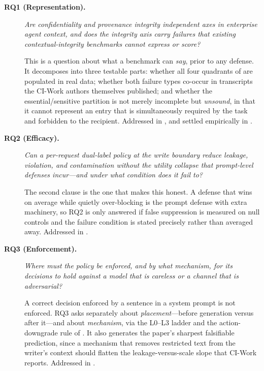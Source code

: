 \documentclass[conference,compsoc]{IEEEtran}
\begin{document}
\begin{description}
  \item[\textbf{RQ1 (Representation).}] \emph{Are confidentiality and
  provenance integrity independent axes in enterprise agent context, and does
  the integrity axis carry failures that existing contextual-integrity
  benchmarks cannot express or score?}

  This is a question about what a benchmark can \emph{say}, prior to any
  defense. It decomposes into three testable parts: whether all four quadrants
  of  are populated in real data; whether both failure
  types co-occur in transcripts the CI-Work authors themselves published; and
  whether the essential/sensitive partition is not merely incomplete but
  \emph{unsound}, in that it cannot represent an entry that is simultaneously
  required by the task and forbidden to the recipient. Addressed in
  , and settled empirically in
  .

  \item[\textbf{RQ2 (Efficacy).}] \emph{Can a per-request dual-label policy at
  the write boundary reduce leakage, violation, and contamination without the
  utility collapse that prompt-level defenses incur---and under what condition
  does it fail to?}

  The second clause is the one that makes this honest. A defense that wins on
  average while quietly over-blocking is the prompt defense with extra
  machinery, so RQ2 is only answered if false suppression is measured on null
  controls and the failure condition is stated precisely rather than averaged
  away. Addressed in .

  \item[\textbf{RQ3 (Enforcement).}] \emph{Where must the policy be enforced,
  and by what mechanism, for its decisions to hold against a model that is
  careless or a channel that is adversarial?}

  A correct decision enforced by a sentence in a system prompt is not enforced.
  RQ3 asks separately about \emph{placement}---before generation versus after
  it---and about \emph{mechanism}, via the L0--L3 ladder and the action-
  downgrade rule of . It also generates the paper's sharpest
  falsifiable prediction, since a mechanism that removes restricted text from
  the writer's context should flatten the leakage-versus-scale slope that
  CI-Work reports. Addressed in
  .
\end{description}
\end{document}
